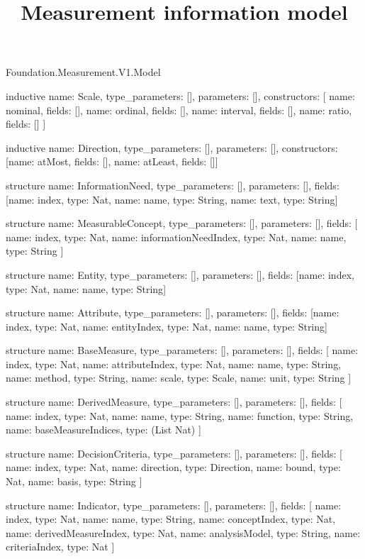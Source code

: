\begin{lexlean}{Foundation.Measurement.V1.Model}
\title{Measurement information model}
\begin{semanticmodule}
inductive{
  name: Scale,
  type_parameters: [],
  parameters: [],
  constructors: [
    {name: nominal, fields: []},
    {name: ordinal, fields: []},
    {name: interval, fields: []},
    {name: ratio, fields: []}
  ]
}

inductive{
  name: Direction,
  type_parameters: [],
  parameters: [],
  constructors: [{name: atMost, fields: []}, {name: atLeast, fields: []}]
}

structure{
  name: InformationNeed,
  type_parameters: [],
  parameters: [],
  fields: [{name: index, type: Nat}, {name: name, type: String}, {name: text, type: String}]
}

structure{
  name: MeasurableConcept,
  type_parameters: [],
  parameters: [],
  fields: [
    {name: index, type: Nat},
    {name: informationNeedIndex, type: Nat},
    {name: name, type: String}
  ]
}

structure{
  name: Entity,
  type_parameters: [],
  parameters: [],
  fields: [{name: index, type: Nat}, {name: name, type: String}]
}

structure{
  name: Attribute,
  type_parameters: [],
  parameters: [],
  fields: [{name: index, type: Nat}, {name: entityIndex, type: Nat}, {name: name, type: String}]
}

structure{
  name: BaseMeasure,
  type_parameters: [],
  parameters: [],
  fields: [
    {name: index, type: Nat},
    {name: attributeIndex, type: Nat},
    {name: name, type: String},
    {name: method, type: String},
    {name: scale, type: Scale},
    {name: unit, type: String}
  ]
}

structure{
  name: DerivedMeasure,
  type_parameters: [],
  parameters: [],
  fields: [
    {name: index, type: Nat},
    {name: name, type: String},
    {name: function, type: String},
    {name: baseMeasureIndices, type: (List Nat)}
  ]
}

structure{
  name: DecisionCriteria,
  type_parameters: [],
  parameters: [],
  fields: [
    {name: index, type: Nat},
    {name: direction, type: Direction},
    {name: bound, type: Nat},
    {name: basis, type: String}
  ]
}

structure{
  name: Indicator,
  type_parameters: [],
  parameters: [],
  fields: [
    {name: index, type: Nat},
    {name: name, type: String},
    {name: conceptIndex, type: Nat},
    {name: derivedMeasureIndex, type: Nat},
    {name: analysisModel, type: String},
    {name: criteriaIndex, type: Nat}
  ]
}


\end{semanticmodule}
\end{lexlean}
